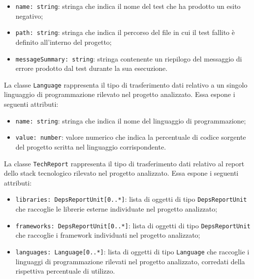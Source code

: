 \documentclass[a4paper, 11pt]{article}
\newcounter{subsubsubsection}[subsubsection]
\begin{document}
\begin{itemize}
  \item \texttt{name: string}: stringa che indica il nome del test che ha prodotto un esito
    negativo;
 
  \item \texttt{path: string}: stringa che indica il percorso del file in cui il test fallito è
    definito all'interno del progetto;
 
  \item \texttt{messageSummary: string}: stringa contenente un riepilogo del messaggio di errore
    prodotto dal test durante la sua esecuzione.
\end{itemize}

 \label{sec:Language}
 
La classe \texttt{Language} rappresenta il tipo di trasferimento dati relativo a un singolo
linguaggio di programmazione rilevato nel progetto analizzato. Essa espone i seguenti attributi:
 
\begin{itemize}
  \item \texttt{name: string}: stringa che indica il nome del linguaggio di programmazione;
 
  \item \texttt{value: number}: valore numerico che indica la percentuale di codice sorgente del
    progetto scritta nel linguaggio corrispondente.
\end{itemize}

\label{sec:TechReport}
 
La classe \texttt{TechReport} rappresenta il tipo di trasferimento dati relativo al report dello
stack tecnologico rilevato nel progetto analizzato. Essa espone i seguenti attributi:
 
\begin{itemize}
  \item \texttt{libraries: DepsReportUnit[0..*]}: lista di oggetti di tipo \texttt{DepsReportUnit}
    che raccoglie le librerie esterne individuate nel progetto analizzato;
 
  \item \texttt{frameworks: DepsReportUnit[0..*]}: lista di oggetti di tipo \texttt{DepsReportUnit}
    che raccoglie i framework individuati nel progetto analizzato;
 
  \item \texttt{languages: Language[0..*]}: lista di oggetti di tipo \texttt{Language} che raccoglie
    i linguaggi di programmazione rilevati nel progetto analizzato, corredati della rispettiva
    percentuale di utilizzo.
\end{itemize}
 
\end{document}
